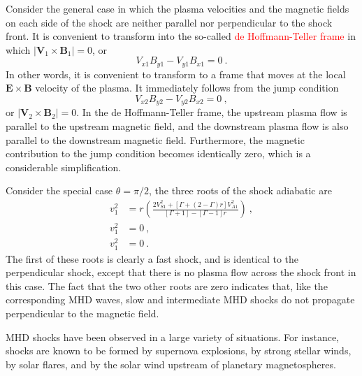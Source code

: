 \documentclass[12pt,a4paper]{article}
\renewcommand{\vec}[1]{\boldsymbol{#1}}
\begin{document}
\cite{Plasma2014} Consider the general case in which the plasma velocities and the magnetic fields on each side of the shock are neither parallel nor perpendicular to the shock front. It is convenient to transform into the so-called \textcolor{red}{de Hoffmann-Teller frame} in which  $|\vec{V}_1 \times \vec{B}_1| = 0$, or
\begin{equation}
V_{x1} B_{y1} -V_{y1} B_{x1} = 0 ~.
\end{equation}
In other words, it is convenient to transform to a frame that moves at the local $\vec{E} \times \vec{B}$ velocity of the plasma. It immediately follows from the jump condition
\begin{equation}
V_{x2} B_{y2} -V_{y2} B_{x2} = 0 ~, 
\end{equation}
or $|\vec{V}_2 \times \vec{B}_2| = 0$. In the de Hoffmann-Teller frame, the upstream plasma flow is parallel to the upstream magnetic field, and the downstream plasma flow is also parallel to the downstream magnetic field. Furthermore, the magnetic contribution to the jump condition becomes identically zero, which is a considerable simplification.






Consider the special case $\theta = \pi/2$, the three roots of the shock adiabatic are
\begin{align}
v_1^2 &= r\left(\frac{2V_{S1}^2 +[\Gamma+ (2-\Gamma)r]V_{A1}^2}{[\Gamma+1] -[\Gamma -1]r} \right) ~, \\
v_1^2 &= 0 ~, \\
v_1^2 &= 0 ~.
\end{align}
The first of these roots is clearly a fast shock, and is identical to the perpendicular shock, except that there is no plasma flow across the shock front in this case. The fact that the two other roots are zero indicates that, like the corresponding MHD waves, slow and intermediate MHD shocks do not propagate perpendicular to the magnetic field.

MHD shocks have been observed in a large variety of situations. For instance, shocks are known to be formed by supernova explosions, by strong stellar winds, by solar flares, and by the solar wind upstream of planetary magnetospheres.
\end{document}
